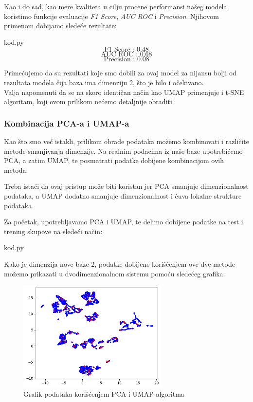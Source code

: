 \documentclass[12pt]{article}
\theoremstyle{definition}
\theoremstyle{remark}
\begin{document}
Kao i do sad, kao mere kvaliteta u cilju procene performansi našeg modela koristimo funkcije evaluacije  \emph{F1 Score}, \emph{AUC ROC} i \emph{Precision}. Njihovom primenom dobijamo sledeće rezultate:

\hfill

{kod.py}
$$
\text{F1 Score : 0.48}
$$
$$
\text{AUC ROC : 0.68}
$$
$$
\text{Precision : 0.08}
$$ 

\hfill

Primećujemo da su rezultati koje smo dobili za ovaj model za nijansu bolji od rezultata modela čija baza ima dimenziju $2$, što je bilo i očekivano.\\

Valja napomenuti da se na skoro identičan način kao UMAP primenjuje i t-SNE algoritam, koji ovom prilikom nećemo detaljnije obraditi.


\subsubsection{Kombinacija PCA-a i UMAP-a}

Kao što smo već istakli, prilikom obrade podataka možemo kombinovati i različite metode smanjivanja dimenzije. Na realnim podacima iz naše baze upotrebićemo PCA, a zatim UMAP, te posmatrati podatke dobijene kombinacijom ovih metoda.

Treba istaći da ovaj pristup može biti koristan jer PCA smanjuje dimenzionalnost podataka, a UMAP dodatno smanjuje dimenzionalnost i čuva lokalne strukture podataka. 

Za početak, upotrebljavamo PCA i UMAP, te delimo dobijene podatke na test i trening skupove na sledeći način:

\hfill

{kod.py}

\hfill


Kako je dimenzija nove baze $2$, podatke dobijene korišćenjem ove dve metode možemo prikazati u dvodimenzionalnom sistemu pomoću sledećeg grafika:

\begin{figure}[htp]
    \centering
    \includegraphics[width=7.5cm]{output_60_0.png}
    \caption{Grafik podataka korišćenjem PCA i UMAP algoritma}
    \label{fig:galaxy}
\end{figure}
\end{document}
